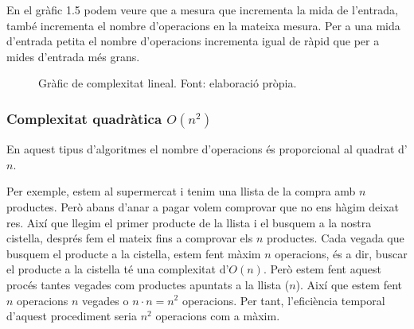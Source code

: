 En el gràfic 1.5 podem veure que a mesura que incrementa la mida de l'entrada, també incrementa el nombre d'operacions en la mateixa mesura. Per a una mida d'entrada petita el nombre d'operacions incrementa igual de ràpid que per a mides d'entrada més grans. 
\begin{figure}[H]
\centering
{}
    \caption[Gràfic de complexitat lineal.]{Gràfic de complexitat lineal. Font: elaboració pròpia.}
    \label{fig:my_label}
\end{figure}


\subsubsection*{Complexitat quadràtica $O(n^2)$}
En aquest tipus d'algoritmes el nombre d'operacions és proporcional al quadrat d'$n$. 

Per exemple, estem al supermercat i tenim una llista de la compra amb $n$ productes. Però abans d'anar a pagar volem comprovar que no ens hàgim deixat res. Així que llegim el primer producte de la llista i el busquem a la nostra cistella, després fem el mateix fins a comprovar els $n$ productes. Cada vegada que busquem el producte a la cistella, estem fent màxim $n$ operacions, és a dir, buscar el producte a la cistella té una complexitat d'$O(n)$. Però estem fent aquest procés tantes vegades com productes apuntats a la llista ($n$). Així que estem fent $n$ operacions $n$ vegades o $n \cdot n = n^2$ operacions. Per tant, l'eficiència temporal d'aquest procediment seria $n^2$ operacions com a màxim.

